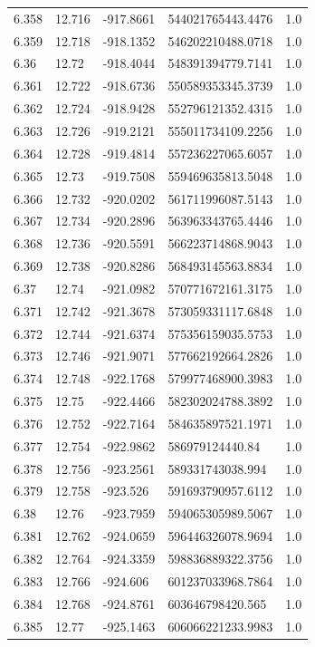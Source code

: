 \begin{tabular}{lllll}
6.358 & 12.716 & -917.8661 & 544021765443.4476 & 1.0 \\
6.359 & 12.718 & -918.1352 & 546202210488.0718 & 1.0 \\
6.36 & 12.72 & -918.4044 & 548391394779.7141 & 1.0 \\
6.361 & 12.722 & -918.6736 & 550589353345.3739 & 1.0 \\
6.362 & 12.724 & -918.9428 & 552796121352.4315 & 1.0 \\
6.363 & 12.726 & -919.2121 & 555011734109.2256 & 1.0 \\
6.364 & 12.728 & -919.4814 & 557236227065.6057 & 1.0 \\
6.365 & 12.73 & -919.7508 & 559469635813.5048 & 1.0 \\
6.366 & 12.732 & -920.0202 & 561711996087.5143 & 1.0 \\
6.367 & 12.734 & -920.2896 & 563963343765.4446 & 1.0 \\
6.368 & 12.736 & -920.5591 & 566223714868.9043 & 1.0 \\
6.369 & 12.738 & -920.8286 & 568493145563.8834 & 1.0 \\
6.37 & 12.74 & -921.0982 & 570771672161.3175 & 1.0 \\
6.371 & 12.742 & -921.3678 & 573059331117.6848 & 1.0 \\
6.372 & 12.744 & -921.6374 & 575356159035.5753 & 1.0 \\
6.373 & 12.746 & -921.9071 & 577662192664.2826 & 1.0 \\
6.374 & 12.748 & -922.1768 & 579977468900.3983 & 1.0 \\
6.375 & 12.75 & -922.4466 & 582302024788.3892 & 1.0 \\
6.376 & 12.752 & -922.7164 & 584635897521.1971 & 1.0 \\
6.377 & 12.754 & -922.9862 & 586979124440.84 & 1.0 \\
6.378 & 12.756 & -923.2561 & 589331743038.994 & 1.0 \\
6.379 & 12.758 & -923.526 & 591693790957.6112 & 1.0 \\
6.38 & 12.76 & -923.7959 & 594065305989.5067 & 1.0 \\
6.381 & 12.762 & -924.0659 & 596446326078.9694 & 1.0 \\
6.382 & 12.764 & -924.3359 & 598836889322.3756 & 1.0 \\
6.383 & 12.766 & -924.606 & 601237033968.7864 & 1.0 \\
6.384 & 12.768 & -924.8761 & 603646798420.565 & 1.0 \\
6.385 & 12.77 & -925.1463 & 606066221233.9983 & 1.0 \\

\end{tabular}
